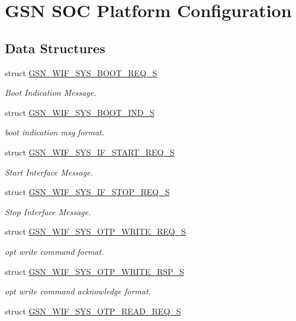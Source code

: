 \hypertarget{a00639}{
\section{GSN SOC Platform Configuration}
\label{a00639}
}
\subsection*{Data Structures}
\begin{DoxyCompactItemize}
\item 
struct \hyperlink{a00348}{GSN\_\-WIF\_\-SYS\_\-BOOT\_\-REQ\_\-S}
\begin{DoxyCompactList}\small\item\em Boot Indication Message. \end{DoxyCompactList}\item 
struct \hyperlink{a00347}{GSN\_\-WIF\_\-SYS\_\-BOOT\_\-IND\_\-S}
\begin{DoxyCompactList}\small\item\em boot indication msg format. \end{DoxyCompactList}\item 
struct \hyperlink{a00353}{GSN\_\-WIF\_\-SYS\_\-IF\_\-START\_\-REQ\_\-S}
\begin{DoxyCompactList}\small\item\em Start Interface Message. \end{DoxyCompactList}\item 
struct \hyperlink{a00355}{GSN\_\-WIF\_\-SYS\_\-IF\_\-STOP\_\-REQ\_\-S}
\begin{DoxyCompactList}\small\item\em Stop Interface Message. \end{DoxyCompactList}\item 
struct \hyperlink{a00360}{GSN\_\-WIF\_\-SYS\_\-OTP\_\-WRITE\_\-REQ\_\-S}
\begin{DoxyCompactList}\small\item\em opt write command format. \end{DoxyCompactList}\item 
struct \hyperlink{a00361}{GSN\_\-WIF\_\-SYS\_\-OTP\_\-WRITE\_\-RSP\_\-S}
\begin{DoxyCompactList}\small\item\em opt write command acknowledge format. \end{DoxyCompactList}\item 
struct \hyperlink{a00358}{GSN\_\-WIF\_\-SYS\_\-OTP\_\-READ\_\-REQ\_\-S}

\end{DoxyCompactItemize}
